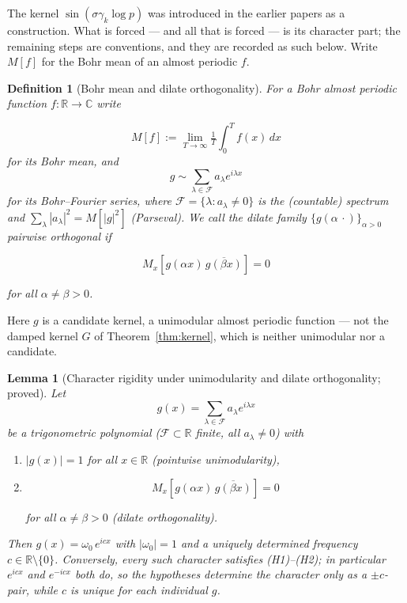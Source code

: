 \documentclass[11pt]{article}
\newtheorem{lemma}[theorem]{Lemma}
\newtheorem{definition}[theorem]{Definition}
\begin{document}
The kernel $\sin(\sigma\gamma_k\log p)$ was introduced in the earlier papers
as a construction. What is forced --- and all that is forced --- is its
character part; the remaining steps are conventions, and they are recorded as
such below. Write $M[f]$ for the Bohr mean of an almost periodic $f$.

\begin{definition}[Bohr mean and dilate orthogonality]
For a Bohr almost periodic function $f:\mathbb{R}\to\mathbb{C}$ write

\[
M[f] := \lim_{T\to\infty} \tfrac1T \int_0^T f(x)\,dx
\]
 for its Bohr mean,
and 
\[
g\sim \sum_{\lambda\in\mathcal{F}} a_\lambda e^{i\lambda x}
\]
 for its
Bohr--Fourier series, where $\mathcal{F} = \{\lambda : a_\lambda \neq 0\}$ is
the (countable) spectrum and $\sum_{\lambda}|a_\lambda|^2 = M[|g|^2]$
(Parseval). We call the dilate family $\{g(\alpha\,\cdot)\}_{\alpha>0}$
\emph{pairwise orthogonal} if

\[
M_x\!\left[g(\alpha x)\,\overline{g(\beta x)}\right] = 0
\]

for all $\alpha \neq \beta > 0$.
\end{definition}

Here $g$ is a candidate kernel, a unimodular almost periodic function --- not
the damped kernel $G$ of Theorem~\ref{thm:kernel}, which is neither unimodular
nor a candidate.

\begin{lemma}[Character rigidity under unimodularity and dilate
orthogonality; proved]
\label{lem:canonicity}
Let 
\[
g(x) = \sum_{\lambda\in\mathcal{F}} a_\lambda e^{i\lambda x}
\]
 be a
trigonometric polynomial ($\mathcal{F}\subset\mathbb{R}$ finite, all
$a_\lambda\neq 0$) with
\begin{enumerate}
\item[(H1)] $|g(x)| = 1$ for all $x\in\mathbb{R}$ (pointwise unimodularity),
\item[(H2)] 
\[
M_x\!\left[g(\alpha x)\,\overline{g(\beta x)}\right] = 0
\]

  for all $\alpha\neq\beta>0$ (dilate orthogonality).
\end{enumerate}
Then $g(x) = \omega_0\, e^{icx}$ with $|\omega_0| = 1$ and a uniquely determined
frequency $c \in \mathbb{R}\setminus\{0\}$. Conversely, every such
character satisfies (H1)--(H2); in particular $e^{icx}$ and $e^{-icx}$
both do, so the hypotheses determine the character only as a
$\pm c$-pair, while $c$ is unique for each individual $g$.
\end{lemma}
\end{document}
